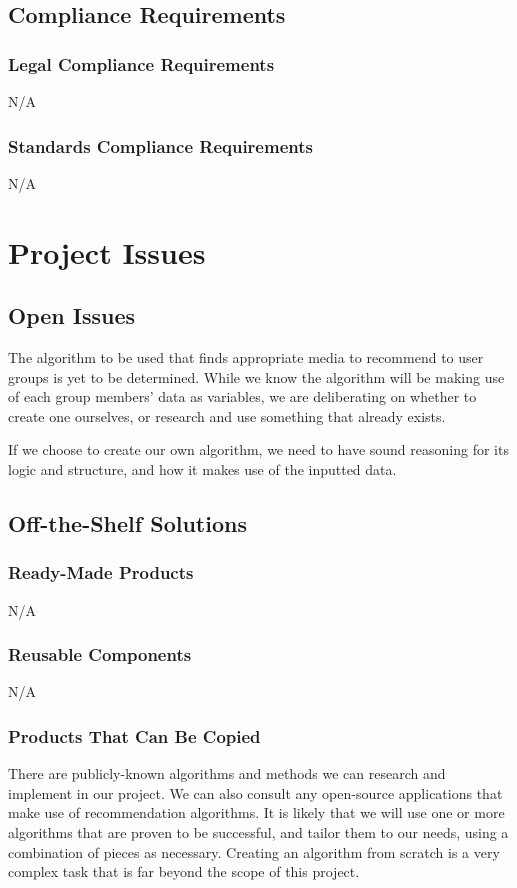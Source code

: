 \documentclass[12pt]{article}
\begin{document}
\subsection{Compliance Requirements}

\subsubsection{Legal Compliance Requirements}
N/A

\subsubsection{Standards Compliance Requirements}
N/A

\section{Project Issues}


\subsection{Open Issues}

The algorithm to be used that finds appropriate media to recommend to user groups is yet to be determined. While we know the algorithm will be making use of each group members' data as variables, we are deliberating on whether to create one ourselves, or research and use something that already exists.

If we choose to create our own algorithm, we need to have sound reasoning for its logic and structure, and how it makes use of the inputted data.

\subsection{Off-the-Shelf Solutions}

\subsubsection{Ready-Made Products}
N/A

\subsubsection{Reusable Components}
N/A

\subsubsection{Products That Can Be Copied}
There are publicly-known algorithms and methods we can research and implement in our project. We can also consult any open-source applications that make use of recommendation algorithms. It is likely that we will use one or more algorithms that are proven to be successful, and tailor them to our needs, using a combination of pieces as necessary. Creating an algorithm from scratch is a very complex task that is far beyond the scope of this project.
\end{document}
